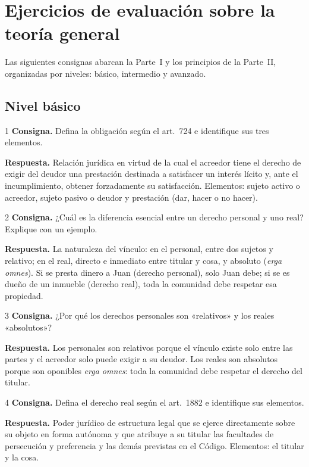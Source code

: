 \documentclass[12pt,oneside]{book}
\begin{document}
\appendix
\chapter{Ejercicios de evaluación sobre la teoría general}\label{ap:ejercicios}

Las siguientes consignas abarcan la Parte~I y los principios de la Parte~II, organizadas por niveles: básico, intermedio y avanzado.

\section{Nivel básico}

\begin{ejercicio}{1}
\textbf{Consigna.} Defina la obligación según el art.~724 e identifique sus tres elementos.

\textbf{Respuesta.} Relación jurídica en virtud de la cual el acreedor tiene el derecho de exigir del deudor una prestación destinada a satisfacer un interés lícito y, ante el incumplimiento, obtener forzadamente su satisfacción. Elementos: sujeto activo o acreedor, sujeto pasivo o deudor y prestación (dar, hacer o no hacer).
\end{ejercicio}

\begin{ejercicio}{2}
\textbf{Consigna.} ¿Cuál es la diferencia esencial entre un derecho personal y uno real? Explique con un ejemplo.

\textbf{Respuesta.} La naturaleza del vínculo: en el personal, entre dos sujetos y relativo; en el real, directo e inmediato entre titular y cosa, y absoluto (\textit{erga omnes}). Si se presta dinero a Juan (derecho personal), solo Juan debe; si se es dueño de un inmueble (derecho real), toda la comunidad debe respetar esa propiedad.
\end{ejercicio}

\begin{ejercicio}{3}
\textbf{Consigna.} ¿Por qué los derechos personales son «relativos» y los reales «absolutos»?

\textbf{Respuesta.} Los personales son relativos porque el vínculo existe solo entre las partes y el acreedor solo puede exigir a su deudor. Los reales son absolutos porque son oponibles \textit{erga omnes}: toda la comunidad debe respetar el derecho del titular.
\end{ejercicio}

\begin{ejercicio}{4}
\textbf{Consigna.} Defina el derecho real según el art.~1882 e identifique sus elementos.

\textbf{Respuesta.} Poder jurídico de estructura legal que se ejerce directamente sobre su objeto en forma autónoma y que atribuye a su titular las facultades de persecución y preferencia y las demás previstas en el Código. Elementos: el titular y la cosa.
\end{ejercicio}
\end{document}
